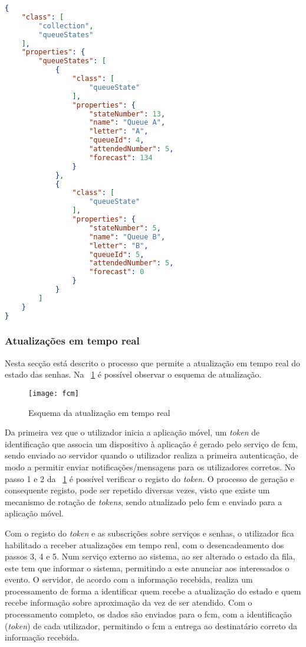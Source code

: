 {\begin{lstlisting}[language=json,firstnumber=1]
{
    "class": [
        "collection",
        "queueStates"
    ],
    "properties": {
        "queueStates": [
            {
                "class": [
                    "queueState"
                ],
                "properties": {
                    "stateNumber": 13,
                    "name": "Queue A",
                    "letter": "A",
                    "queueId": 4,
                    "attendedNumber": 5,
                    "forecast": 134
                }
            },
            {
                "class": [
                    "queueState"
                ],
                "properties": {
                    "stateNumber": 5,
                    "name": "Queue B",
                    "letter": "B",
                    "queueId": 5,
                    "attendedNumber": 5,
                    "forecast": 0
                }
            }
        ]
    }
}
\end{lstlisting}

\subsubsection{Atualizações em tempo real} 
Nesta secção está descrito o processo que permite a atualização em tempo real do estado das senhas. Na \figurename~\ref{fig:live_update} é possível observar o esquema de atualização. 

\begin{figure}[ht]
	\centering
	\texttt{[image: fcm]}
	  \caption{Esquema da atualização em tempo real}
  \label{fig:live_update}
\end{figure}

Da primeira vez que o utilizador inicia a aplicação móvel, um \textit{token} de identificação que associa um dispositivo à aplicação é gerado pelo serviço de \acrshort{fcm}, sendo enviado ao servidor quando o utilizador realiza a primeira autenticação, de modo a permitir enviar notificações/mensagens para os utilizadores corretos. No passo 1 e 2 da \figurename~\ref{fig:live_update} é possível verificar o registo do \textit{token}. O processo de geração e consequente registo, pode ser repetido diversas vezes, visto que existe um mecanismo de rotação de \textit{tokens}, sendo atualizado pelo \acrshort{fcm} e enviado para a aplicação móvel. 

Com o registo do \textit{token} e as subscrições sobre serviços e senhas, o utilizador fica habilitado a receber atualizações em tempo real, com o desencadeamento dos passos 3, 4 e 5. Num serviço externo ao sistema, ao ser alterado o estado da fila, este tem que informar o sistema, permitindo a este anunciar aos interessados o evento. O servidor, de acordo com a informação recebida, realiza um processamento de forma a identificar quem recebe a atualização do estado e quem recebe informação sobre aproximação da vez de ser atendido. Com o processamento completo, os dados são enviados para o \acrshort{fcm}, com a identificação (\textit{token}) de cada utilizador, permitindo o \acrshort{fcm} a entrega ao destinatário correto da informação recebida.

}
